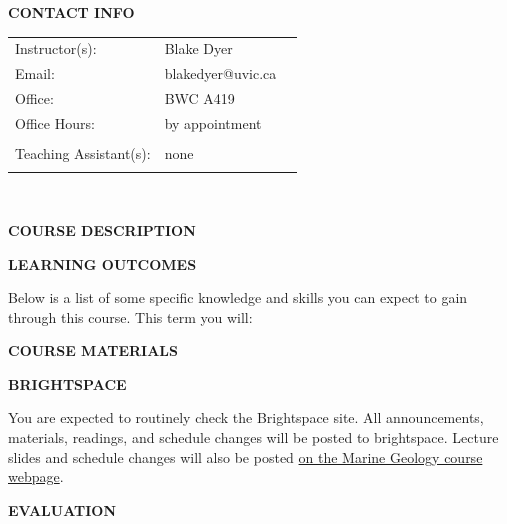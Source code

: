\documentclass[11pt]{article}
\begin{document}
\textbf{CONTACT INFO}

\begin{center}
	\centering
	\begin{tabular}{ L{.25\linewidth}L{.25\linewidth}L{.0\linewidth} }
		Instructor(s):         & Blake Dyer        & \\
		Email:                 & blakedyer@uvic.ca & \\
		Office:                & BWC A419          & \\
		Office Hours:          & by appointment    & \\
		                       &                   & \\
		Teaching Assistant(s): & none              & \\
		                       &                   & \\
	\end{tabular}\\
\end{center}

\begin{center}
	\textbf{COURSE DESCRIPTION}
\end{center}


\clearpage

\textbf{LEARNING OUTCOMES}

Below is a list of some specific knowledge and skills you can expect to gain through this course. This term you will:
\begin{itemize}
	\setlength\itemsep{0em}
	{\item \learningoutcome}
\end{itemize}


\textbf{COURSE MATERIALS}



\textbf{BRIGHTSPACE}

You are expected to routinely check the Brightspace site. All announcements, materials, readings, and schedule changes will be posted to brightspace. Lecture slides and schedule changes will also be posted \href{https://eos-courses.readthedocs.io/en/latest/eos408-public/overview.html}{on the Marine Geology course webpage}.

\begin{center}
	\textbf{EVALUATION}
\end{center}
\end{document}
